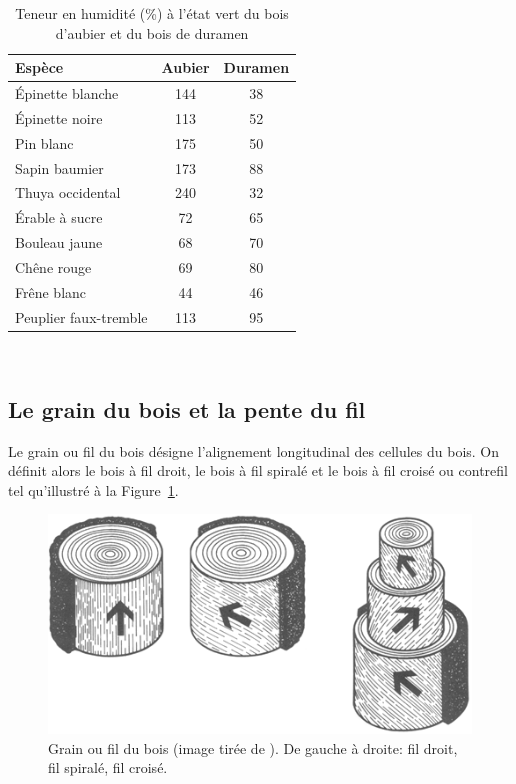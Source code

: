 \begin{table}[ht]

\centering
	
	\begin{tabular}{l c c}
	\hline
	\bf Espèce	& \bf Aubier & \bf Duramen \\
	\hline\hline
	Épinette blanche  & 144 &  38\\
	Épinette noire   & 113 & 52 \\
	Pin blanc   & 175 &  50 \\
	Sapin baumier   & 173  & 88 \\
	Thuya occidental  & 240 &  32 \\
	\hline
	Érable à sucre   & 72 &  65 \\
	Bouleau jaune   & 68 & 70  \\
	Chêne rouge   & 69 &  80 \\
	Frêne blanc   & 44 & 46 \\
	Peuplier faux-tremble  & 113 & 95 \\
	\hline
	\end{tabular}

\caption{\label{humidite} Teneur en humidité (\%) à l'état vert du bois d'aubier et du bois de duramen}
\end{table}
~

\subsection{Le grain du bois et la pente du fil}
 
Le grain ou fil du bois désigne l'alignement longitudinal des cellules du bois. On définit alors le bois à fil droit, le bois à fil spiralé et le bois à fil croisé ou contrefil tel qu'illustré à la Figure~\ref{fil}. 


\begin{figure}[h]
\centering
\includegraphics[scale=0.7]{img/ch2_fil}
\caption{Grain ou fil du bois (image tirée de \cite{bowyer2007forest}). De gauche à droite: fil droit, fil spiralé, fil croisé.}
\label{fil}
\end{figure}

